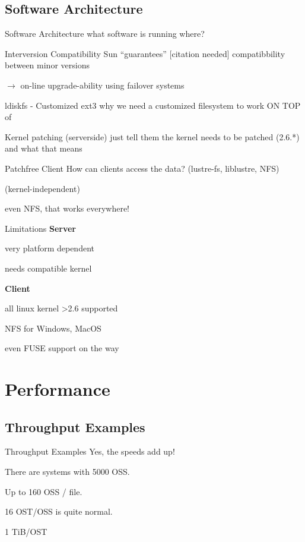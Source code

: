 \documentclass[compress,t,xcolor=dvipsnames]{beamer}
\newcommand{\sectiontoc}{
    \begin{frame}{\textbf{\insertsectionhead}}
        \tableofcontents[current]
    \end{frame}

    \addtocounter{framenumber}{-1}%
}
\begin{document}
\subsection{Software Architecture}
\begin{frame}{Software Architecture}
    what software is running where?
\end{frame}
\begin{frame}{Interversion Compatibility}
    Sun ``guarantees'' [citation needed] compatibbility between
    minor versions

    $\rightarrow$ on-line upgrade-ability using failover systems
\end{frame}
\begin{frame}{ldiskfs - Customized ext3}
    why we need a customized filesystem to work ON TOP of
\end{frame}
\begin{frame}{Kernel patching (serverside)}
    just tell them the kernel needs to be patched (2.6.*) and what that means
\end{frame}
\begin{frame}{Patchfree Client}
    How can clients access the data? (lustre-fs, liblustre, NFS)

    (kernel-independent)

    even NFS, that works everywhere!
\end{frame}
\begin{frame}{Limitations}
    \textbf{Server}

    very platform dependent

    needs compatible kernel

    \textbf{Client}

    all linux kernel \textgreater2.6 supported

    NFS for Windows, MacOS

    even FUSE support on the way
\end{frame}


\section{Performance}
\sectiontoc

\subsection{Throughput Examples}
\begin{frame}{Throughput Examples}
    Yes, the speeds add up!

    There are systems with 5000 OSS.

    Up to 160 OSS / file.

    16 OST/OSS is quite normal.

    1 TiB/OST
\end{frame}
\end{document}
